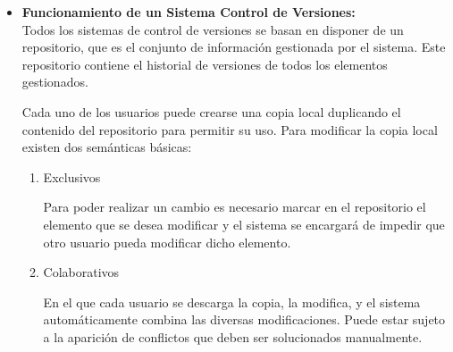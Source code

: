 \begin{itemize}
\item \textbf{Funcionamiento de un Sistema Control de Versiones:} \\

Todos los sistemas de control de versiones se basan en disponer de un repositorio, que es el conjunto de información gestionada por el sistema. Este repositorio contiene el historial de versiones de todos los elementos gestionados.

Cada uno de los usuarios puede crearse una copia local duplicando el contenido del repositorio para permitir su uso. Para modificar la copia local existen dos semánticas básicas:\\

\begin{enumerate}[1.] %
\item Exclusivos

Para poder realizar un cambio es necesario marcar en el repositorio el elemento que se desea modificar y el sistema se encargará de impedir que otro usuario pueda modificar dicho elemento.\\

\item Colaborativos

En el que cada usuario se descarga la copia, la modifica, y el sistema automáticamente combina las diversas modificaciones. Puede estar sujeto a la aparición de conflictos que deben ser solucionados manualmente.\\
\end{enumerate}
\end{itemize} 

